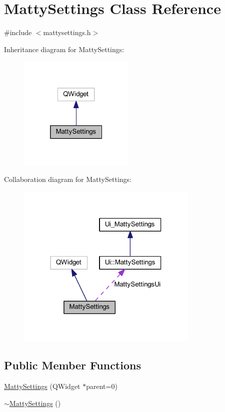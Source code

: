 \hypertarget{classMattySettings}{}\section{Matty\+Settings Class Reference}
\label{classMattySettings}


{\ttfamily \#include $<$mattysettings.\+h$>$}



Inheritance diagram for Matty\+Settings\+:
\nopagebreak
\begin{figure}[H]
\begin{center}
\leavevmode
\includegraphics[width=157pt]{classMattySettings__inherit__graph}
\end{center}
\end{figure}


Collaboration diagram for Matty\+Settings\+:
\nopagebreak
\begin{figure}[H]
\begin{center}
\leavevmode
\includegraphics[width=246pt]{classMattySettings__coll__graph}
\end{center}
\end{figure}
\subsection*{Public Member Functions}
\begin{DoxyCompactItemize}
\item 
\hyperlink{classMattySettings_a0d5b0f74bacfcad4f084772a081294a9}{Matty\+Settings} (Q\+Widget $\ast$parent=0)
\item 
\hyperlink{classMattySettings_a361e58579542394627a34f07f408aa3a}{$\sim$\+Matty\+Settings} ()
\end{DoxyCompactItemize}
